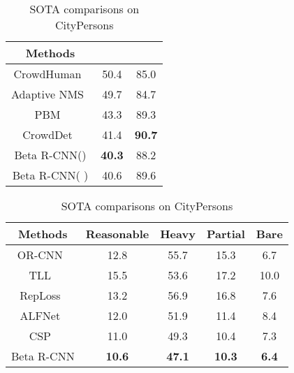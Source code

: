 \documentclass{article}
\begin{document}
\begin{table}[htbp]
    \begin{minipage}[t]{0.5\textwidth}
\centering
        \caption{SOTA comparisons on CrowdHuman}
        \scriptsize
\begin{tabular}{ccc}
            \toprule
            Methods &  &  \\
            \midrule
            CrowdHuman~\cite{crowdhuman} & 50.4 & 85.0 \\
            Adaptive NMS~\cite{AdaptiveNMS} & 49.7 & 84.7 \\
            PBM~\cite{PBM} & 43.3 & 89.3 \\
            CrowdDet~\cite{EMD} & 41.4 & \textbf{90.7} \\
            \midrule
            Beta R-CNN() & \textbf{40.3} & 88.2 \\
            Beta R-CNN( )& 40.6 & 89.6 \\
            \bottomrule
        \end{tabular}
    \label{crowdhuman}
    \end{minipage}
    \begin{minipage}[t]{0.5\textwidth}
        \centering
        \caption{SOTA comparisons on CityPersons}
        \label{citypersons}
        \scriptsize
        \begin{tabular}{ccccc}
            \toprule
            Methods &  Reasonable & Heavy & Partial & Bare \\
            \midrule
            OR-CNN~\cite{OR-CNN} & 12.8 & 55.7 & 15.3 & 6.7 \\
            TLL~\cite{TLL} & 15.5 & 53.6 & 17.2 & 10.0 \\
            RepLoss~\cite{RepLoss} & 13.2 & 56.9 & 16.8 & 7.6 \\
            ALFNet~\cite{ALFNet} & 12.0 & 51.9 & 11.4 & 8.4 \\
            CSP~\cite{csp} & 11.0 & 49.3 & 10.4 & 7.3 \\
            \midrule
            Beta R-CNN & \textbf{10.6} & \textbf{47.1} & \textbf{10.3} & \textbf{6.4} \\
\bottomrule
        \end{tabular}
    \end{minipage}
\end{table}
\end{document}
